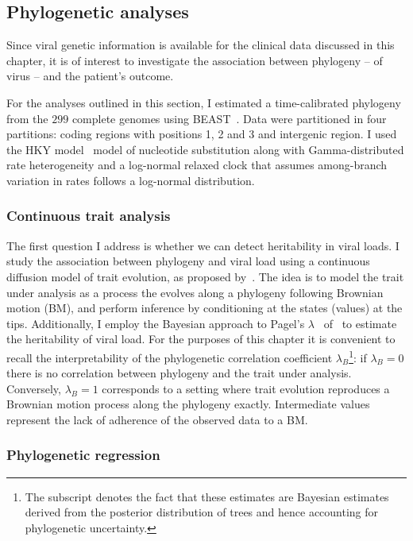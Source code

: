 \subsection{Phylogenetic analyses}

Since viral genetic information is available for the clinical data discussed in this chapter, it is of interest to investigate the association between phylogeny -- of virus -- and the patient's outcome.

For the analyses outlined in this section, I estimated a time-calibrated phylogeny from the $299$ complete genomes using BEAST~\citep{Drummond2012}.
Data were partitioned in four partitions: coding regions with positions 1, 2 and 3 and intergenic region.
I used the HKY model~\citep{Hasegawa1985} model of nucleotide substitution along with Gamma-distributed rate heterogeneity and a log-normal relaxed clock that assumes among-branch variation in rates follows a log-normal distribution.

\subsubsection{Continuous trait analysis}
\label{sec:cta}

The first question I address is whether we can detect heritability in viral loads.
I study the association between phylogeny and viral load using a continuous diffusion model of trait evolution, as proposed by~\cite{Lemey2010}.
The idea is to model the trait under analysis as a process the evolves along a phylogeny following Brownian motion (BM), and perform inference by conditioning at the states (values) at the tips.
Additionally, I employ the Bayesian approach to Pagel's $\lambda$~\citep{Pagel1999} of~\cite{Vrancken2015} to estimate the heritability of viral load.
For the purposes of this chapter it is convenient to recall the interpretability of the phylogenetic correlation coefficient $\lambda_B$\footnote{The subscript denotes the fact that these estimates are Bayesian estimates derived from the posterior distribution of trees and hence accounting for phylogenetic uncertainty.}: if $\lambda_B = 0$ there is no correlation between phylogeny and the trait under analysis.
Conversely, $\lambda_B = 1$ corresponds to a setting where trait evolution reproduces a Brownian motion process along the phylogeny exactly.
Intermediate values represent the lack of adherence of the observed data to a BM.

\subsubsection{Phylogenetic regression}
\label{sec:phyloreg}

